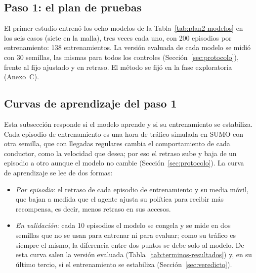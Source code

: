 \subsection{Paso 1: el plan de pruebas}
\label{sec:resultado-principal}

El primer estudio entrenó los ocho modelos de la
Tabla~\ref{tab:plan2-modelos} en los seis casos (siete en la malla),
tres veces cada uno, con 200 episodios por entrenamiento: 138
entrenamientos. La versión evaluada de cada modelo se midió con 30
semillas, las mismas para todos los controles
(Sección~\ref{sec:protocolo}), frente al fijo ajustado y en retraso. El
método se fijó en la fase exploratoria (Anexo~C).

\subsection{Curvas de aprendizaje del paso 1}
\label{sec:ejecucion-indicadores}

Esta subsección responde si el modelo aprende y si su entrenamiento se
estabiliza. Cada episodio de entrenamiento es una hora de tráfico
simulada en SUMO con otra semilla, que con llegadas regulares cambia el
comportamiento de cada conductor, como la velocidad que desea; por eso
el retraso sube y baja de un episodio a otro aunque el modelo no cambie
(Sección~\ref{sec:protocolo}). La curva de aprendizaje se lee de dos
formas:
\begin{itemize}
  \item \emph{Por episodio}: el retraso de cada episodio de
    entrenamiento y su media móvil, que bajan a medida que el agente
    ajusta su política para recibir más recompensa, es decir, menos
    retraso en sus accesos.
  \item \emph{En validación}: cada 10 episodios el modelo se congela y
    se mide en dos semillas que no se usan para entrenar ni para
    evaluar; como su tráfico es siempre el mismo, la diferencia entre
    dos puntos se debe solo al modelo. De esta curva salen la versión
    evaluada (Tabla~\ref{tab:terminos-resultados}) y, en su último
    tercio, si el entrenamiento se estabiliza
    (Sección~\ref{sec:veredicto}).
\end{itemize}

